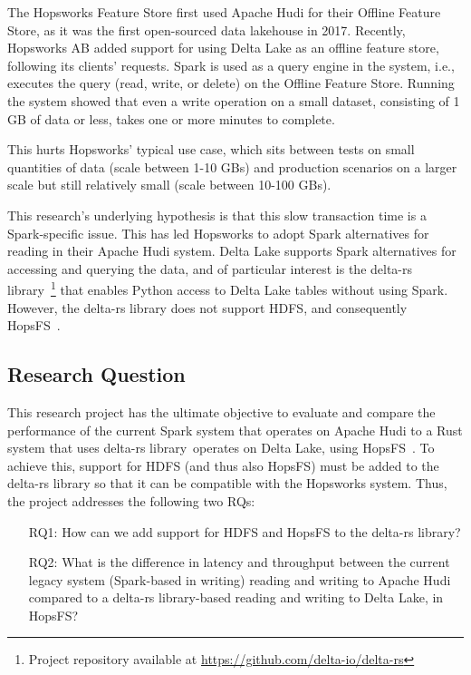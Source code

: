 The Hopsworks Feature Store \cite{10.1145/3626246.3653389} first used Apache Hudi for their Offline Feature Store, as it was the first open-sourced data lakehouse in 2017. Recently, Hopsworks \gls{AB} added support for using Delta Lake as an offline feature store, following its clients' requests. Spark is used as a query engine in the system, i.e., executes the query (read, write, or delete) on the Offline Feature Store. Running the system showed that even a write operation on a small dataset, consisting of 1 GB of data or less, takes one or more minutes to complete.

This hurts Hopsworks' typical use case, which sits between tests on small quantities of data (scale between 1-10 GBs) and production scenarios on a larger scale but still relatively small (scale between 10-100 GBs).

This research's underlying hypothesis is that this slow transaction time is a Spark-specific issue. This has led Hopsworks to adopt Spark alternatives \cite{Khazanchi1801362} for reading in their Apache Hudi system. Delta Lake supports Spark alternatives for accessing and querying the data, and of particular interest is the delta-rs library~\footnote{Project repository available at \url{https://github.com/delta-io/delta-rs}} that enables Python access to Delta Lake tables without using Spark. 
However, the delta-rs library does not support \gls{HDFS}, and consequently \gls{HopsFS}~\cite{niaziHopsFSScalingHierarchical2017}.

\subsection{Research Question}
\label{subsec:researchQuestion}
This research project has the ultimate objective to evaluate and compare the performance of the current Spark system that operates on Apache Hudi to a Rust system that uses delta-rs library~\footnotemark[\value{footnote}] operates on Delta Lake, using \gls{HopsFS}~\cite{niaziHopsFSScalingHierarchical2017}. To achieve this, support for \gls{HDFS} (and thus also \gls{HopsFS}) must be added to the delta-rs library so that it can be compatible with the Hopsworks system. Thus, the project addresses the following two \glspl{RQ}:
\begin{enumerate}
    \item[RQ1:] How can we add support for \gls{HDFS} and \gls{HopsFS} to the delta-rs library?
    \item[RQ2:] What is the difference in latency and throughput between the current legacy system (Spark-based in writing) reading and writing to Apache Hudi compared to a delta-rs library-based reading and writing to Delta Lake, in \gls{HopsFS}?
\end{enumerate}

